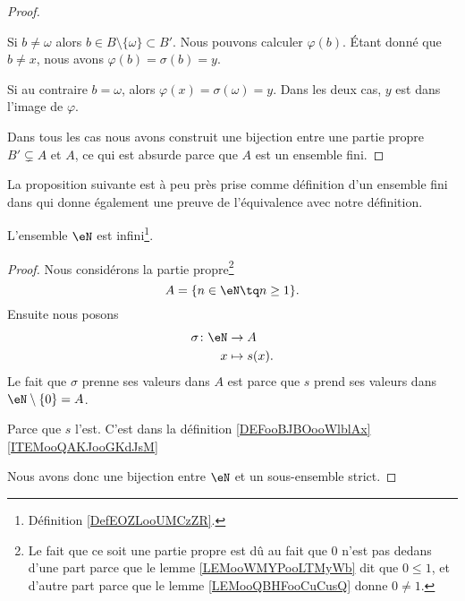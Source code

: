 \begin{proof}
\begin{subproof}
\begin{subproof}
			Si \( b\neq \omega\) alors \( b\in B\setminus\{ \omega \}\subset B'\). Nous pouvons calculer \( \varphi(b)\). Étant donné que \( b\neq x\), nous avons \( \varphi(b)=\sigma(b)=y\).

			Si au contraire \( b=\omega\), alors \( \varphi(x)=\sigma(\omega)=y\). Dans les deux cas, \( y\) est dans l'image de \( \varphi\).
		\end{subproof}
	\end{subproof}
	Dans tous les cas nous avons construit une bijection entre une partie propre \( B'\subsetneq A\) et \( A\), ce qui est absurde parce que \( A\) est un ensemble fini.
\end{proof}

La proposition suivante est à peu près prise comme définition d'un ensemble fini dans \cite{ooVAYLooJxVYex} qui donne également une preuve de l'équivalence avec notre définition.
\begin{proposition}     \label{PROPooBYKCooGDkfWy}
	L'ensemble \( \eN\) est infini\footnote{Définition \ref{DefEOZLooUMCzZR}.}.
\end{proposition}

\begin{proof}
	Nous considérons la partie propre\footnote{Le fait que ce soit une partie propre est dû au fait que \( 0\) n'est pas dedans d'une part parce que le lemme \ref{LEMooWMYPooLTMyWb} dit que \( 0\leq 1\), et d'autre part parce que le lemme \ref{LEMooQBHFooCuCusQ} donne \( 0\neq 1\).}
	\begin{equation}
		A=\{ n\in \eN\tq n\geq 1 \}.
	\end{equation}
	Ensuite nous posons
	\begin{equation}
		\begin{aligned}
			\sigma\colon \eN & \to A         \\
			x                & \mapsto s(x).
		\end{aligned}
	\end{equation}
	Le fait que \( \sigma\) prenne ses valeurs dans \( A\) est parce que \( s\) prend ses valeurs dans \( \eN\setminus\{ 0 \}=A\).
	\begin{subproof}
		Parce que \( s\) l'est.
		C'est dans la définition \ref{DEFooBJBOooWlblAx}\ref{ITEMooQAKJooGKdJsM}
	\end{subproof}
	Nous avons donc une bijection entre \( \eN\) et un sous-ensemble strict.
\end{proof}

